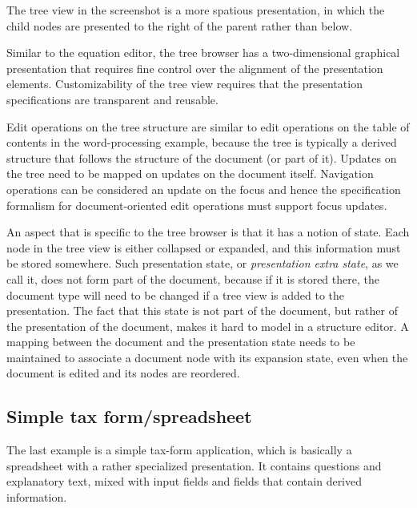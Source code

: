 The tree view in the screenshot is a more spatious presentation, in which the child nodes are presented to the right of the parent rather than below.



Similar to the equation editor, the tree browser has a two-dimensional graphical presentation that requires fine control over the alignment of the presentation elements. Customizability of the tree view requires that the presentation specifications are transparent and reusable. 

Edit operations on the tree structure are similar to edit operations on the table of contents in the word-processing example, because the tree is typically a derived structure that follows the structure of the document (or part of it). Updates on the tree need to be mapped on updates on the document itself. Navigation operations can be considered an update on the  focus and hence the specification formalism for document-oriented edit operations must support focus updates.

An aspect that is specific to the tree browser is that it has a notion of state. Each node in the tree view is either collapsed or expanded, and this information must be stored somewhere. Such presentation state, or {\em presentation extra state}, as we call it, does not form part of the document, because if it is stored there, the document type will need to be changed if a tree view is added to the presentation. The fact that this state is not part of the document, but rather of the presentation of the document, makes it hard to model in a structure editor. A mapping between the document and the presentation state needs to be maintained to associate a document node with its expansion state, even when the document is edited and its nodes are reordered. 


%																
\subsection{Simple tax form/spreadsheet}

The last example is a simple tax-form application, which is basically a spreadsheet with a rather specialized presentation. It contains questions and explanatory text, mixed with input fields and fields that contain derived information. 

